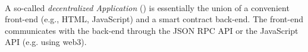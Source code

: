 \paragraph{\dapp}
\label{sec:dapp}

A so-called \emph{decentralized Application} (\dapp) is essentially the union of
a convenient front-end (e.g., HTML, JavaScript) and a smart contract back-end.
The front-end communicates with the back-end through the JSON RPC API or the
JavaScript API (e.g. using web3).
